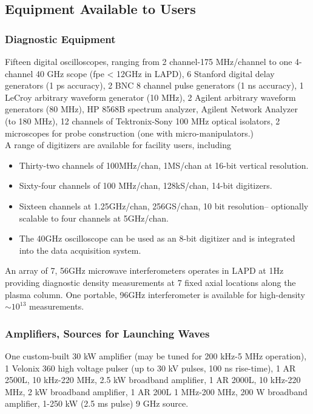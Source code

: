 \documentclass[11pt]{article}
\begin{document}
\pagebreak
\subsection{Equipment Available to Users}

\subsubsection{Diagnostic Equipment}
Fifteen digital oscilloscopes, ranging from 2 channel-175 MHz/channel to one 4-channel 40 GHz scope (fpe < 12GHz in LAPD), 6 Stanford digital delay generators (1 ps accuracy), 2 BNC 8 channel pulse generators (1 ns accuracy), 1 LeCroy arbitrary waveform generator (10 MHz), 2 Agilent arbitrary waveform generators (80 MHz), HP 8568B spectrum analyzer, Agilent Network Analyzer (to 180 MHz), 12 channels of Tektronix-Sony 100 MHz optical isolators, 2 microscopes for probe construction (one with micro-manipulators.)\\
	A range of digitizers are available for facility users, including
\begin{itemize}
\item Thirty-two channels of 100MHz/chan, 1MS/chan at 16-bit vertical resolution.
\item Sixty-four  channels of 100 MHz/chan, 128kS/chan, 14-bit digitizers.
\item Sixteen channels at 1.25GHz/chan, 256GS/chan, 10 bit resolution-- optionally scalable to four channels at 5GHz/chan.

\item The 40GHz oscilloscope can be used as an 8-bit digitizer and is integrated into the data acquisition system.
\end{itemize}
	An array of 7, 56GHz microwave interferometers operates in LAPD at 1Hz providing diagnostic density measurements at 7 fixed axial locations along the plasma column. One portable, 96GHz interferometer is available for high-density $ \sim 10^{13}$ measurements.

\subsubsection{Amplifiers, Sources for Launching Waves}
One custom-built 30 kW amplifier (may be tuned for 200 kHz-5 MHz operation), 1 Velonix 360 high voltage pulser (up to 30 kV pulses, 100 ns rise-time), 1 AR 2500L, 10 kHz-220 MHz, 2.5 kW broadband amplifier, 1 AR 2000L, 10 kHz-220 MHz, 2 kW broadband amplifier, 1 AR 200L 1 MHz-200 MHz, 200 W broadband amplifier, 1-250 kW (2.5 ms pulse) 9 GHz source.
\end{document}
